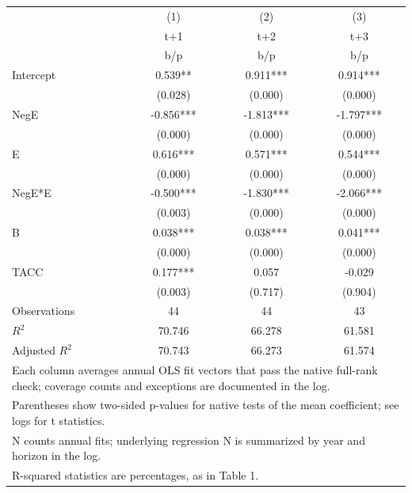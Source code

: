 {
\def\sym#1{\ifmmode^{#1}\else\(^{#1}\)\fi}
\begin{tabular}{l*{3}{c}}
\hline\hline
                    &\multicolumn{1}{c}{(1)}&\multicolumn{1}{c}{(2)}&\multicolumn{1}{c}{(3)}\\
                    &\multicolumn{1}{c}{t+1}&\multicolumn{1}{c}{t+2}&\multicolumn{1}{c}{t+3}\\
                    &         b/p   &         b/p   &         b/p   \\
\hline
Intercept           &       0.539** &       0.911***&       0.914***\\
                    &     (0.028)   &     (0.000)   &     (0.000)   \\
NegE                &      -0.856***&      -1.813***&      -1.797***\\
                    &     (0.000)   &     (0.000)   &     (0.000)   \\
E                   &       0.616***&       0.571***&       0.544***\\
                    &     (0.000)   &     (0.000)   &     (0.000)   \\
NegE*E              &      -0.500***&      -1.830***&      -2.066***\\
                    &     (0.003)   &     (0.000)   &     (0.000)   \\
B                   &       0.038***&       0.038***&       0.041***\\
                    &     (0.000)   &     (0.000)   &     (0.000)   \\
TACC                &       0.177***&       0.057   &      -0.029   \\
                    &     (0.003)   &     (0.717)   &     (0.904)   \\
\hline
Observations        &          44   &          44   &          43   \\
\(R^{2}\)           &      70.746   &      66.278   &      61.581   \\
Adjusted \(R^{2}\)  &      70.743   &      66.273   &      61.574   \\
\hline\hline
\multicolumn{4}{l}{\footnotesize Each column averages annual OLS fit vectors that pass the native full-rank check; coverage counts and exceptions are documented in the log.}\\
\multicolumn{4}{l}{\footnotesize Parentheses show two-sided p-values for native tests of the mean coefficient; see logs for t statistics.}\\
\multicolumn{4}{l}{\footnotesize N counts annual fits; underlying regression N is summarized by year and horizon in the log.}\\
\multicolumn{4}{l}{\footnotesize R-squared statistics are percentages, as in Table 1.}\\
\end{tabular}
}
